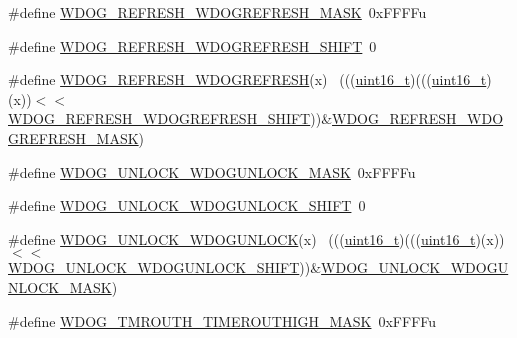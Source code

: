 \begin{DoxyCompactItemize}
\item 
\#define \hyperlink{group___w_d_o_g___register___masks_ga59e560838a4c519b514c0def0d6034fa}{W\+D\+O\+G\+\_\+\+R\+E\+F\+R\+E\+S\+H\+\_\+\+W\+D\+O\+G\+R\+E\+F\+R\+E\+S\+H\+\_\+\+M\+A\+SK}~0x\+F\+F\+F\+Fu
\item 
\#define \hyperlink{group___w_d_o_g___register___masks_ga526acc27150ff67f1f026bdcc1bb364c}{W\+D\+O\+G\+\_\+\+R\+E\+F\+R\+E\+S\+H\+\_\+\+W\+D\+O\+G\+R\+E\+F\+R\+E\+S\+H\+\_\+\+S\+H\+I\+FT}~0
\item 
\#define \hyperlink{group___w_d_o_g___register___masks_gac8bddfffd653d08494c2379dd56190fd}{W\+D\+O\+G\+\_\+\+R\+E\+F\+R\+E\+S\+H\+\_\+\+W\+D\+O\+G\+R\+E\+F\+R\+E\+SH}(x)                        ~(((\hyperlink{_p_e___types_8h_a1f1825b69244eb3ad2c7165ddc99c956}{uint16\+\_\+t})(((\hyperlink{_p_e___types_8h_a1f1825b69244eb3ad2c7165ddc99c956}{uint16\+\_\+t})(x))$<$$<$\hyperlink{group___w_d_o_g___register___masks_ga526acc27150ff67f1f026bdcc1bb364c}{W\+D\+O\+G\+\_\+\+R\+E\+F\+R\+E\+S\+H\+\_\+\+W\+D\+O\+G\+R\+E\+F\+R\+E\+S\+H\+\_\+\+S\+H\+I\+FT}))\&\hyperlink{group___w_d_o_g___register___masks_ga59e560838a4c519b514c0def0d6034fa}{W\+D\+O\+G\+\_\+\+R\+E\+F\+R\+E\+S\+H\+\_\+\+W\+D\+O\+G\+R\+E\+F\+R\+E\+S\+H\+\_\+\+M\+A\+SK})
\item 
\#define \hyperlink{group___w_d_o_g___register___masks_gadcf9026f6f2730a765e504ec4c7126a8}{W\+D\+O\+G\+\_\+\+U\+N\+L\+O\+C\+K\+\_\+\+W\+D\+O\+G\+U\+N\+L\+O\+C\+K\+\_\+\+M\+A\+SK}~0x\+F\+F\+F\+Fu
\item 
\#define \hyperlink{group___w_d_o_g___register___masks_ga07ed92839744d67e4c393b00bc293246}{W\+D\+O\+G\+\_\+\+U\+N\+L\+O\+C\+K\+\_\+\+W\+D\+O\+G\+U\+N\+L\+O\+C\+K\+\_\+\+S\+H\+I\+FT}~0
\item 
\#define \hyperlink{group___w_d_o_g___register___masks_ga7fd9cc224e9c1b23f313f9bf419a5596}{W\+D\+O\+G\+\_\+\+U\+N\+L\+O\+C\+K\+\_\+\+W\+D\+O\+G\+U\+N\+L\+O\+CK}(x)                            ~(((\hyperlink{_p_e___types_8h_a1f1825b69244eb3ad2c7165ddc99c956}{uint16\+\_\+t})(((\hyperlink{_p_e___types_8h_a1f1825b69244eb3ad2c7165ddc99c956}{uint16\+\_\+t})(x))$<$$<$\hyperlink{group___w_d_o_g___register___masks_ga07ed92839744d67e4c393b00bc293246}{W\+D\+O\+G\+\_\+\+U\+N\+L\+O\+C\+K\+\_\+\+W\+D\+O\+G\+U\+N\+L\+O\+C\+K\+\_\+\+S\+H\+I\+FT}))\&\hyperlink{group___w_d_o_g___register___masks_gadcf9026f6f2730a765e504ec4c7126a8}{W\+D\+O\+G\+\_\+\+U\+N\+L\+O\+C\+K\+\_\+\+W\+D\+O\+G\+U\+N\+L\+O\+C\+K\+\_\+\+M\+A\+SK})
\item 
\#define \hyperlink{group___w_d_o_g___register___masks_ga4c46affdc0cd5ed2cde734812f783d31}{W\+D\+O\+G\+\_\+\+T\+M\+R\+O\+U\+T\+H\+\_\+\+T\+I\+M\+E\+R\+O\+U\+T\+H\+I\+G\+H\+\_\+\+M\+A\+SK}~0x\+F\+F\+F\+Fu

\end{DoxyCompactItemize}
